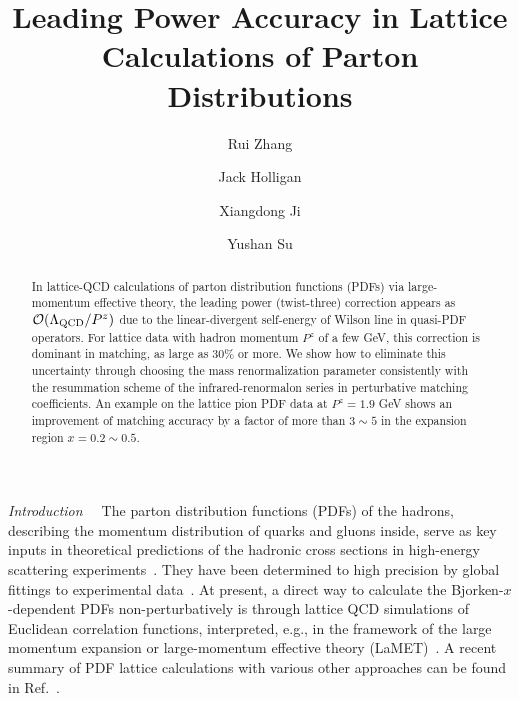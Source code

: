 \documentclass[prd,aps,nofootinbib,superscriptaddress,floatfix,preprintnumbers,twocolumn]{revtex4}
\begin{document}
\title{Leading Power Accuracy in Lattice Calculations of Parton Distributions}
\author{Rui Zhang}
\author{Jack Holligan}
\author{Xiangdong Ji}
\author{Yushan Su}
\begin{abstract}

In lattice-QCD calculations of parton distribution functions (PDFs) via large-momentum effective theory, the leading power (twist-three) correction appears as ${\cal O}(\Lambda_{\rm QCD}/P^z)$ due to the linear-divergent self-energy of Wilson line in quasi-PDF operators. For lattice data with hadron momentum $P^z$ of a few GeV, this correction is dominant in matching, as large as 30\% or more. We show how to eliminate this uncertainty through choosing the mass renormalization parameter consistently with the resummation scheme of the infrared-renormalon series in perturbative matching coefficients. An example on the lattice pion PDF data at $P^z = 1.9$ GeV shows an improvement of matching accuracy by a factor of more than $3\sim 5$ in the expansion region $x= 0.2\sim 0.5$.

\end{abstract}

\maketitle

{\it Introduction~~}  The parton distribution functions (PDFs) of the hadrons, describing the momentum distribution of quarks and gluons inside, serve as key inputs in theoretical predictions of the hadronic cross sections in high-energy scattering
experiments~\cite{Ellis:1996mzs}. They have been determined to high precision by global fittings to experimental data~\cite{Aicher:2010cb,Ball:2017nwa,Hou:2019efy,Bailey:2020ooq,Novikov:2020snp,Barry:2021osv}. At present, a direct way to calculate the Bjorken-$x$-dependent PDFs non-perturbatively is through lattice QCD simulations of Euclidean correlation functions, interpreted, e.g., in the framework of the large momentum expansion or large-momentum effective theory (LaMET)~\cite{Ji:2013dva,Ji:2014gla}. A recent summary of PDF lattice
calculations with various other approaches can be found in Ref.~\cite{Constantinou:2022yye}.
\end{document}
